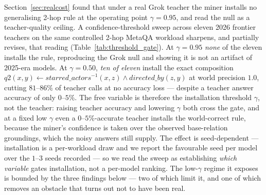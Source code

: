 \documentclass[11pt]{article}
\theoremstyle{plain}
\begin{document}
Section~\ref{sec:realcost} found that under a real Grok teacher the miner installs
no generalising 2-hop rule at the operating point $\gamma{=}0.95$, and read the
null as a teacher-quality ceiling. A confidence-threshold sweep across eleven
2026 frontier teachers on the same controlled 2-hop MetaQA workload sharpens, and
partially revises, that reading (Table~\ref{tab:threshold_gate}). At
$\gamma{=}0.95$ \emph{none} of the eleven installs the rule, reproducing the Grok
null and showing it is not an artifact of 2025-era models. At $\gamma{=}0.50$,
\emph{ten of eleven} install the exact composition
$q2(x,y)\!\leftarrow\!\mathit{starred\_actors}^{-1}(x,z)\wedge\mathit{directed\_by}(z,y)$
at world precision $1.0$, cutting $81$--$86\%$ of teacher calls at no accuracy
loss --- despite a teacher answer accuracy of only $0$--$5\%$. The free variable
is therefore the installation threshold $\gamma$, not the teacher: raising teacher
accuracy and lowering $\gamma$ both cross the gate, and at a fixed low $\gamma$
even a $0$--$5\%$-accurate teacher installs the world-correct rule, because the
miner's confidence is taken over the observed base-relation groundings, which the
noisy answers still supply. The effect is seed-dependent --- installation is a
per-workload draw and we report the favourable seed per model over the $1$--$3$
seeds recorded --- so we read the sweep as establishing \emph{which variable}
gates installation, not a per-model ranking. The low-$\gamma$ regime it exposes
is bounded by the three findings below --- two of which limit it, and one of
which removes an obstacle that turns out not to have been real.


\end{document}
